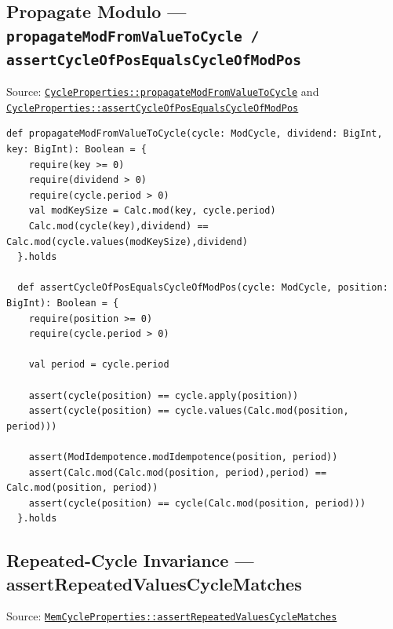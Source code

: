 \subsection{\texorpdfstring{Propagate Modulo ---
  \protect\texttt{propagateModFromValueToCycle /}\newline
  \protect\texttt{assertCycleOfPosEqualsCycleOfModPos}}
  {Propagate Modulo -- propagateModFromValueToCycle / assertCycleOfPosEqualsCycleOfModPos}}

{\raggedright
Source:
\href{https://github.com/thiagomata/prime-numbers/blob/cycle-article-v1.0.0/src/main/scala/v1/chapter4/cycle/properties/CycleProperties.scala}{\texttt{CycleProperties::\allowbreak propagateModFromValueToCycle}}
and
\href{https://github.com/thiagomata/prime-numbers/blob/cycle-article-v1.0.0/src/main/scala/v1/chapter4/cycle/properties/CycleProperties.scala}{\texttt{CycleProperties::\allowbreak assertCycleOfPosEqualsCycleOfModPos}}
\par}

\begin{lstlisting}[style=scala]
  def propagateModFromValueToCycle(cycle: ModCycle, dividend: BigInt, key: BigInt): Boolean = {
    require(key >= 0)
    require(dividend > 0)
    require(cycle.period > 0)
    val modKeySize = Calc.mod(key, cycle.period)
    Calc.mod(cycle(key),dividend) == Calc.mod(cycle.values(modKeySize),dividend)
  }.holds

  def assertCycleOfPosEqualsCycleOfModPos(cycle: ModCycle, position: BigInt): Boolean = {
    require(position >= 0)
    require(cycle.period > 0)

    val period = cycle.period

    assert(cycle(position) == cycle.apply(position))
    assert(cycle(position) == cycle.values(Calc.mod(position, period)))

    assert(ModIdempotence.modIdempotence(position, period))
    assert(Calc.mod(Calc.mod(position, period),period) == Calc.mod(position, period))
    assert(cycle(position) == cycle(Calc.mod(position, period)))
  }.holds
\end{lstlisting}

\subsection{Repeated-Cycle Invariance --- assertRepeatedValuesCycleMatches}

{\raggedright
Source:
\href{https://github.com/thiagomata/prime-numbers/blob/cycle-article-v1.0.0/src/main/scala/v1/chapter4/cycle/memory/properties/MemCycleProperties.scala}{\texttt{MemCycleProperties::\allowbreak assertRepeatedValuesCycleMatches}}
\par}

